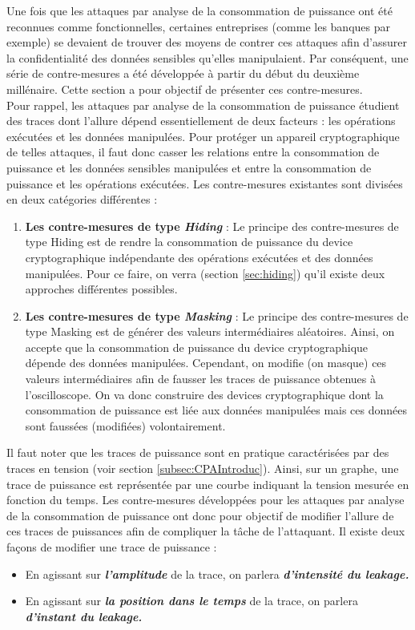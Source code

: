\documentclass[10pt, oneside, a4paper]{article}
\begin{document}
\vspace{-0.2 cm}Une fois que les attaques par analyse de la consommation de puissance ont été reconnues comme fonctionnelles, certaines entreprises (comme les banques par exemple) se devaient de trouver des moyens de contrer ces attaques afin d'assurer la confidentialité des données sensibles qu'elles manipulaient. Par conséquent, une série de contre-mesures a été développée à partir du début du deuxième millénaire. Cette section a pour objectif de présenter ces contre-mesures. \\ Pour rappel, les attaques par analyse de la consommation de puissance étudient des traces dont l'allure dépend essentiellement de deux facteurs : les opérations exécutées et les données manipulées. Pour protéger un appareil cryptographique de telles attaques, il faut donc casser les relations entre la consommation de puissance et les données sensibles manipulées et entre la consommation de puissance et les opérations exécutées. Les contre-mesures existantes sont divisées en deux catégories différentes : 
\begin{enumerate}
\item \textbf{Les contre-mesures de type \textit{Hiding}} : Le principe des contre-mesures de type Hiding est de rendre la consommation de puissance du device cryptographique indépendante des opérations exécutées et des données manipulées. Pour ce faire, on verra (section \ref{sec:hiding}) qu'il existe deux approches différentes possibles.
\item \textbf{Les contre-mesures de type \textit{Masking}} : Le principe des contre-mesures de type Masking est de générer des valeurs intermédiaires aléatoires. Ainsi, on accepte que la consommation de puissance du device cryptographique dépende des données manipulées. Cependant, on modifie (on masque) ces valeurs intermédiaires afin de fausser les traces de puissance obtenues à l'oscilloscope. On va donc construire des devices cryptographique dont la consommation de puissance est liée aux données manipulées mais ces données sont faussées (modifiées) volontairement. \\
\end{enumerate}

\vspace{-0.2 cm}Il faut noter que les traces de puissance sont en pratique caractérisées par des traces en tension (voir section \ref{subsec:CPAIntroduc}). Ainsi, sur un graphe, une trace de puissance est représentée par une courbe indiquant la tension mesurée en fonction du temps. Les contre-mesures développées pour les attaques par analyse de la consommation de puissance ont donc pour objectif de modifier l'allure de ces traces de puissances afin de compliquer la tâche de l'attaquant. Il existe deux façons de modifier une trace de puissance : 
\begin{itemize}
\item En agissant sur \textbf{\textit{l'amplitude}} de la trace, on parlera \textbf{\textit{d'intensité du leakage.}}
\item En agissant sur \textbf{\textit{la position dans le temps}} de la trace, on parlera \textbf{\textit{d'instant du leakage.}} \\
\end{itemize}
\end{document}
